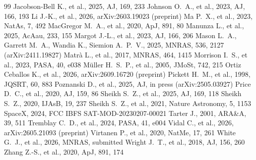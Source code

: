 \documentclass[twocolumn,twocolappendix]{openjournal}
\begin{document}
\begin{thebibliography}{99}
 Jacobson-Bell K., et al., 2025, AJ, 169, 233
 Johnson O.~A., et al., 2023, AJ, 166, 193
 Li J.-K., et al., 2026, arXiv:2603.19023 (preprint)
 Ma P.~X., et al., 2023, NatAs, 7, 492
 MacGregor M.~A., et al., 2020, ApJ, 891, 80
 Manunza L., et al., 2025, AcAau, 233, 155
 Margot J.-L., et al., 2023, AJ, 166, 206
 Mason L.~A., Garrett M.~A., Wandia K., Siemion A.~P.~V., 2025, MNRAS, 536, 2127 (arXiv:2411.19827)
 Matrà L., et al., 2017, MNRAS, 464, 1415
 Morrison I.~S., et al., 2023, PASA, 40, e038
 M\"uller H.~S.~P., et al., 2005, JMoSt, 742, 215
 Ortiz Ceballos K., et al., 2026, arXiv:2609.16720 (preprint)
 Pickett H.~M., et al., 1998, JQSRT, 60, 883
 Poznanski D., et al., 2025, AJ, in press (arXiv:2505.03927)
 Price D.~C., et al., 2020, AJ, 159, 86
 Sheikh S.~Z., et al., 2025, AJ, 169, 118
 Sheikh S.~Z., 2020, IJAsB, 19, 237
 Sheikh S.~Z., et al., 2021, Nature Astronomy, 5, 1153
 SpaceX, 2024, FCC IBFS SAT-MOD-20230207-00021
 Tarter J., 2001, ARA\&A, 39, 511
 Tremblay C.~D., et al., 2024, PASA, 41, e004
 Vidal C., et al., 2026, arXiv:2605.21093 (preprint)
 Virtanen P., et al., 2020, NatMe, 17, 261
 White G.~J., et al., 2026, MNRAS, submitted
 Wright J.~T., et al., 2018, AJ, 156, 260
 Zhang Z.-S., et al., 2020, ApJ, 891, 174
\end{thebibliography}
\end{document}
